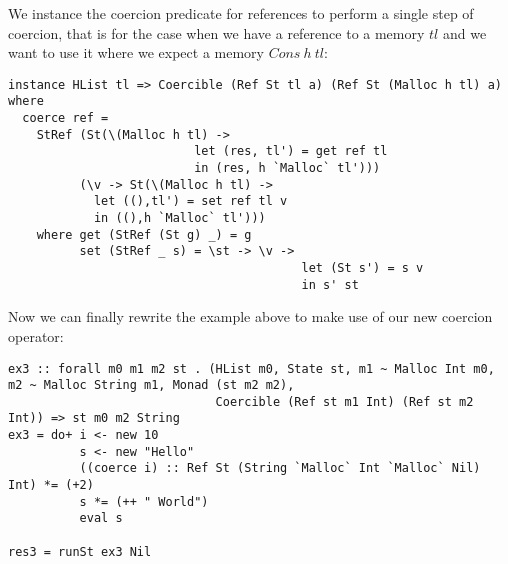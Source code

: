 We instance the coercion predicate for references to perform a single step of coercion, that is for the case when we have a reference to a memory $tl$ and we want to use it where we expect a memory $Cons\ h\ tl$:
\begin{lstlisting}
instance HList tl => Coercible (Ref St tl a) (Ref St (Malloc h tl) a) where
  coerce ref =
    StRef (St(\(Malloc h tl) ->
                          let (res, tl') = get ref tl
                          in (res, h `Malloc` tl')))
          (\v -> St(\(Malloc h tl) -> 
            let ((),tl') = set ref tl v
            in ((),h `Malloc` tl')))
    where get (StRef (St g) _) = g
          set (StRef _ s) = \st -> \v -> 
                                         let (St s') = s v
                                         in s' st
\end{lstlisting}

Now we can finally rewrite the example above to make use of our new coercion operator:
\begin{lstlisting}
ex3 :: forall m0 m1 m2 st . (HList m0, State st, m1 ~ Malloc Int m0, m2 ~ Malloc String m1, Monad (st m2 m2),
                             Coercible (Ref st m1 Int) (Ref st m2 Int)) => st m0 m2 String
ex3 = do+ i <- new 10
          s <- new "Hello"
          ((coerce i) :: Ref St (String `Malloc` Int `Malloc` Nil) Int) *= (+2)
          s *= (++ " World")
          eval s

res3 = runSt ex3 Nil
\end{lstlisting}
